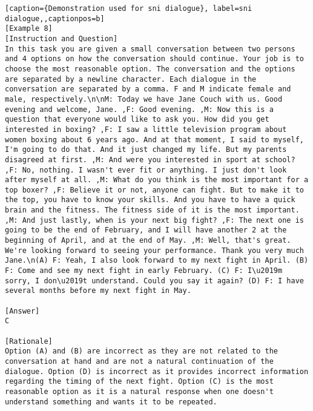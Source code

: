 \begin{lstlisting}[caption={Demonstration used for sni dialogue}, label=sni dialogue,,captionpos=b]
[Example 8]
[Instruction and Question]
In this task you are given a small conversation between two persons and 4 options on how the conversation should continue. Your job is to choose the most reasonable option. The conversation and the options are separated by a newline character. Each dialogue in the conversation are separated by a comma. F and M indicate female and male, respectively.\n\nM: Today we have Jane Couch with us. Good evening and welcome, Jane. ,F: Good evening. ,M: Now this is a question that everyone would like to ask you. How did you get interested in boxing? ,F: I saw a little television program about women boxing about 6 years ago. And at that moment, I said to myself, I'm going to do that. And it just changed my life. But my parents disagreed at first. ,M: And were you interested in sport at school? ,F: No, nothing. I wasn't ever fit or anything. I just don't look after myself at all. ,M: What do you think is the most important for a top boxer? ,F: Believe it or not, anyone can fight. But to make it to the top, you have to know your skills. And you have to have a quick brain and the fitness. The fitness side of it is the most important. ,M: And just lastly, when is your next big fight? ,F: The next one is going to be the end of February, and I will have another 2 at the beginning of April, and at the end of May. ,M: Well, that's great. We're looking forward to seeing your performance. Thank you very much Jane.\n(A) F: Yeah, I also look forward to my next fight in April. (B) F: Come and see my next fight in early February. (C) F: I\u2019m sorry, I don\u2019t understand. Could you say it again? (D) F: I have several months before my next fight in May.

[Answer]
C

[Rationale]
Option (A) and (B) are incorrect as they are not related to the conversation at hand and are not a natural continuation of the dialogue. Option (D) is incorrect as it provides incorrect information regarding the timing of the next fight. Option (C) is the most reasonable option as it is a natural response when one doesn't understand something and wants it to be repeated.




\end{lstlisting}
